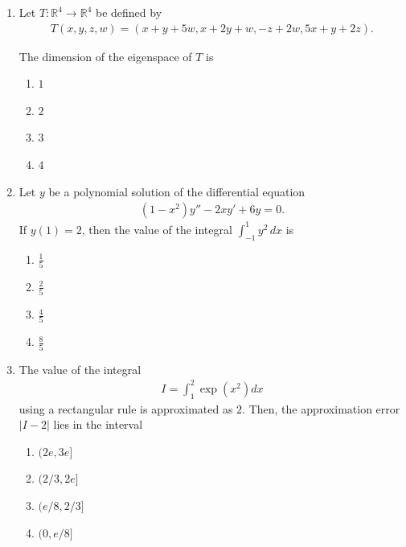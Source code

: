 \documentclass[journal]{IEEEtran}
\numberwithin{equation}{enumi}
\numberwithin{figure}{enumi}
\begin{document}
\begin{enumerate}
\item Let $T:\mathbb{R}^4 \to \mathbb{R}^4$ be defined by
\begin{align*}
 T(x, y, z, w) = (x + y + 5w, x + 2y + w, -z + 2w, 5x + y + 2z).   
\end{align*}

The dimension of the eigenspace of $T$ is  
\hfill{}
\begin{multicols}{4}
\begin{enumerate}
\item  $1$ \hspace{2cm}
\item  $2$ \hspace{2cm}
\item  $3$ \hspace{2cm}
\item  $4$
\end{enumerate}
\end{multicols}




\item Let $y$ be a polynomial solution of the differential equation
\begin{align*}
(1 - x^2)y'' - 2xy' + 6y = 0.
\end{align*}
If $y(1) = 2$, then the value of the integral $\displaystyle\int_{-1}^{1} y^2 \, dx$ is
\hfill{}
\begin{multicols}{4}
\begin{enumerate}
\item $\frac{1}{5}$ \hspace{2cm}
\item  $\frac{2}{5}$ \hspace{2cm}
\item  $\frac{4}{5}$ \hspace{2cm}
\item  $\frac{8}{5}$ 
\end{enumerate}
\end{multicols}


    

\item The value of the integral
\begin{align*}
I = \int_1^2 \exp(x^2) dx
\end{align*}
using a rectangular rule is approximated as $2$. Then, the approximation error $|I - 2|$ lies in the interval
\hfill{}
\begin{multicols}{4}
\begin{enumerate}
\item  $(2e, 3e]$ \hspace{2cm}
\item  $(2/3, 2e]$ \hspace{2cm}
\item  $(e/8, 2/3]$ \hspace{2cm}
\item  $(0, e/8]$
\end{enumerate}
\end{multicols}


\end{enumerate}
\end{document}
